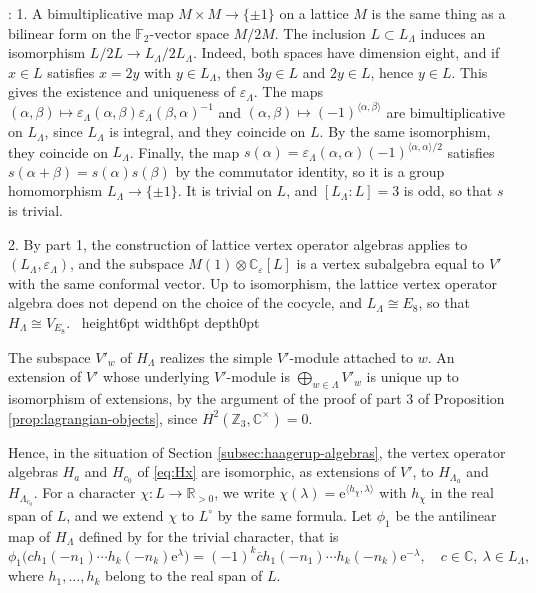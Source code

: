 \documentclass[leqno]{article}
\newcommand{\Cbb}{\ensuremath{\mathbb{C}}}
\newcommand{\Z}{\ensuremath{\mathbb{Z}}}
\newcommand{\R}{\ensuremath{\mathbb{R}}}
\newcommand{\qed}{\hfill \vrule height6pt  width6pt depth0pt}
\newcommand{\co}{\colon}
\newcommand{\ot}{\otimes}
\newcommand{\ovl}{\overline}
\newcommand{\epsi}{\varepsilon}
\newcommand{\e}{\mathrm{e}} %
\newenvironment{proof}[1][]{\noindent {\it Proof #1} : }{\hbox{~}\qed
\smallskip
}
\numberwithin{equation}{section}
\begin{document}
\begin{proof}
1. A bimultiplicative map $M \times M \to \{\pm 1\}$ on a lattice $M$ is the same thing as a bilinear form on the $\mathbb F_2$-vector space $M/2M$. The inclusion $L \subset L_\Lambda$ induces an isomorphism $L/2L \to L_\Lambda/2L_\Lambda$. Indeed, both spaces have dimension eight, and if $x \in L$ satisfies $x = 2y$ with $y \in L_\Lambda$, then $3y \in L$ and $2y \in L$, hence $y \in L$. This gives the existence and uniqueness of $\epsi_\Lambda$. The maps $(\alpha,\beta) \mapsto \epsi_\Lambda(\alpha,\beta)\epsi_\Lambda(\beta,\alpha)^{-1}$ and $(\alpha,\beta) \mapsto (-1)^{\langle \alpha,\beta\rangle}$ are bimultiplicative on $L_\Lambda$, since $L_\Lambda$ is integral, and they coincide on $L$. By the same isomorphism, they coincide on $L_\Lambda$. Finally, the map $s(\alpha) = \epsi_\Lambda(\alpha,\alpha)(-1)^{\langle\alpha,\alpha\rangle/2}$ satisfies $s(\alpha+\beta) = s(\alpha)s(\beta)$ by the commutator identity, so it is a group homomorphism $L_\Lambda \to \{\pm 1\}$. It is trivial on $L$, and $[L_\Lambda:L] = 3$ is odd, so that $s$ is trivial.

2. By part 1, the construction of lattice vertex operator algebras \cite[Chapter 8]{FLM88} applies to $(L_\Lambda,\epsi_\Lambda)$, and the subspace $M(1) \ot \Cbb_{\epsi}[L]$ is a vertex subalgebra equal to $V'$ with the same conformal vector. Up to isomorphism, the lattice vertex operator algebra does not depend on the choice of the cocycle, and $L_\Lambda \cong E_8$, so that $H_\Lambda \cong V_{E_8}$.
\end{proof}

The subspace $V'_w$ of $H_\Lambda$ realizes the simple $V'$-module attached to $w$. An extension of $V'$ whose underlying $V'$-module is $\bigoplus_{w \in \Lambda}V'_w$ is unique up to isomorphism of extensions, by the argument of the proof of part 3 of Proposition \ref{prop:lagrangian-objects}, since $H^2(\Z_3,\Cbb^\times) = 0$.

Hence, in the situation of Section \ref{subsec:haagerup-algebras}, the vertex operator algebras $H_a$ and $H_{c_0}$ of \eqref{eq:Hx} are isomorphic, as extensions of $V'$, to $H_{\Lambda_a}$ and $H_{\Lambda_{c_0}}$. For a character $\chi \co L \to \R_{>0}$, we write $\chi(\lambda) = \e^{\langle h_\chi,\lambda\rangle}$ with $h_\chi$ in the real span of $L$, and we extend $\chi$ to $L^\circ$ by the same formula. Let $\phi_{1}$ be the antilinear map of $H_\Lambda$ defined by \cite[(10.3)]{Arh26} for the trivial character, that is
\[
\phi_1\big(c  h_1(-n_1)\cdots h_k(-n_k)\e^\lambda\big) = (-1)^k  \ovl{c}  h_1(-n_1)\cdots h_k(-n_k)\e^{-\lambda},\quad c \in \Cbb,\ \lambda \in L_\Lambda,
\]
where $h_1, \ldots, h_k$ belong to the real span of $L$.
\end{document}
